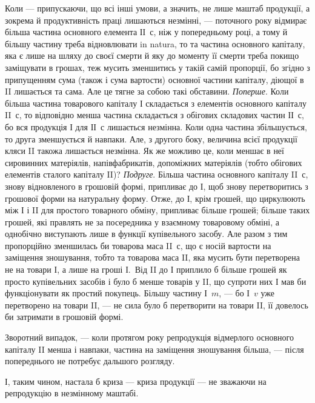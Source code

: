 Коли — припускаючи, що всі інші умови, а значить, не лише маштаб
продукції, а зокрема й продуктивність праці лишаються незмінні, —
поточного року відмирає більша частина основного елемента ІІ~$с$, ніж у
попередньому році, а тому й більшу частину треба відновлювати in
natura, то та частина основного капіталу, яка є лише на шляху до своєї
смерти й яку до моменту її смерти треба покищо заміщувати в грошах,
теж мусить зменшитись у такій самій пропорції, бо згідно з припущенням
сума (також і сума вартости) основної частини капіталу, діющої в II
лишається та сама. Але це тягне за собою такі обставини. \emph{Поперше}. Коли
більша частина товарового капіталу І складається з елементів основного
капіталу II~$с$, то відповідно менша частина складається з обігових складових
частин ІІ~$с$, бо вся продукція І для ІІ~$с$ лишається незмінна. Коли одна
частина збільшується, то друга зменшується й навпаки. Але, з другого
боку, величина всієї продукції кляси II такожа лишається незмінна. Як
же можливо це, коли меншає в неї сировинних матеріялів, напівфабрикатів,
допоміжних матеріялів (тобто обігових елементів сталого капіталу II)?
\emph{Подруге}. Більша частина основного капіталу II~$с$, знову відновленого в
грошовій формі, припливає до І, щоб знову перетворитись з грошової
форми на натуральну форму. Отже, до І, крім грошей, що циркулюють
між І і II для простого товарного обміну, припливає більше грошей;
більше таких грошей, які правлять не за посередника у взаємному товаровому
обміні, а однобічно виступають лише в функції купівельного
засобу. Але разом з тим пропорційно зменшилась би товарова маса
II~$с$, що є носій вартости на заміщення зношування, тобто та товарова
маса II, яка мусить бути перетворена не на товари І, а лише на гроші І.~Від II до І приплило б більше грошей як просто купівельних засобів і
було б менше товарів у II, що супроти них І мав би функціонувати як
простий покупець. Більшу частину І~$m$, — бо І~$v$ уже перетворено на товари
II, — не сила було б перетворити на товари II, її довелось би затримати в
грошовій формі.

Зворотний випадок, — коли протягом року репродукція відмерлого
основного капіталу II менша і навпаки, частина на заміщення зношування
більша, — після попереднього не потребує дальшого розгляду.

І, таким чином, настала б криза — криза продукції — не зважаючи на
репродукцію в незмінному маштабі.

